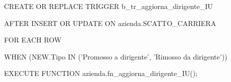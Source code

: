         \ttfamily
            \begin{flushleft}
                \begin{description}
                    \item CREATE OR REPLACE TRIGGER b\_tr\_aggiorna\_dirigente\_IU
                    \item AFTER INSERT OR UPDATE ON azienda.SCATTO\_CARRIERA
                    \item FOR EACH ROW
                    \item WHEN (NEW.Tipo IN ('Promosso a dirigente', 'Rimosso da dirigente')) 
                    \item EXECUTE FUNCTION azienda.fn\_aggiorna\_dirigente\_IU();
                \end{description}
            \end{flushleft}
        \normalfont




